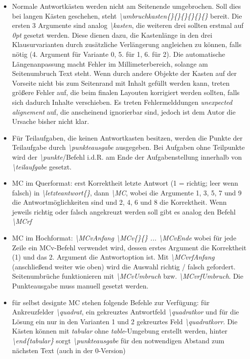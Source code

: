 \documentclass[./main.tex]{subfiles}
\begin{document}
\begin{itemize}
    \item Normale Antwortk\"asten werden nicht am Seitenende umgebrochen. Soll dies bei langen K\"asten geschehen, steht \textit{\textbackslash umbruchkasten\{\}\{\}\{\}\{\}\{\}\{\}} bereit. Die ersten 3 Argumente sind analog \textit{\textbackslash kasten}, die weiteren drei sollten erstmal auf \textit{0pt} gesetzt werden. Diese dienen dazu, die Kastenl\"ange in den drei Klausurvarianten durch zus\"atzliche Verl\"angerung angleichen zu k\"onnen, falls n\"otig (4. Argument f\"ur Variante 0, 5. f\"ur 1, 6. f\"ur 2). Die automatische L\"angenanpassung macht Fehler im Millimeterbereich, solange am Seitenumbruch Text steht. Wenn durch andere Objekte der Kasten auf der Vorseite nicht bis zum Seitenrand mit Inhalt gef\"ullt werden kann, treten gr\"o\ss{}ere Fehler auf, die beim finalen Layouten korrigiert werden sollten, falls sich dadurch Inhalte verschieben. Es treten Fehlermelddungen \textit{unexpected alignement} auf, die anscheinend ignorierbar sind, jedoch ist dem Autor die Ursache bisher nicht klar. 
    \item F\"ur Teilaufgaben, die keinen Antwortkasten besitzen, werden die Punkte der Teilaufgabe durch \textit{\textbackslash punkteausgabe} ausgegeben. Bei Aufgaben ohne Teilpunkte wird der \textit{\textbackslash punkte}\-/Befehl i.d.R. am Ende der Aufgabenstellung innerhalb von \textit{\textbackslash teilaufgabe} gesetzt. 
    \item MC im Querformat: erst Korrektheit letzte Antwort (1 = richtig; leer wenn falsch) in \textit{\textbackslash letzteantwort\{\}}, dann \textit{\textbackslash MC}, wobei die Argumente 1, 3, 5, 7 und 9 die Antwortm\"oglichkeiten sind und 2, 4, 6 und 8 die Korrektheit. Wenn jeweils richtig oder falsch angekreuzt werden soll gibt es analog den Befehl \textit{\textbackslash MCrf}
    \item MC im Hochformat: \textit{\textbackslash MCvAnfang \textbackslash MCv\{\}\{\} ... \textbackslash MCvEnde} wobei f\"ur jede Zeile ein MCv-Befehl verwendet wird, dessen erstes Argument die Korrektheit (1) und das 2. Argument die Antwortoption ist. Mit \textit{\textbackslash MCvrfAnfang} (anschlie\ss{}end weiter wie oben) wird die Auswahl richtig / falsch gefordert. Seitenumbrüche funktionieren mit \textit{\textbackslash MCvUmbruch} bzw. \textit{\textbackslash MCvrfUmbruch}. Die Punkteausgabe muss manuell gesetzt werden.
    \item f\"ur selbst designte MC stehen folgende Befehle zur Verf\"ugung: f\"ur Ankreuzfelder \textit{\textbackslash quadrat}, ein gekreuztes Antwortfeld \textit{\textbackslash quadratkor} und f\"ur die L\"osung ein nur in den Varianten 1 und 2 gekreuztes Feld \textit{\textbackslash quadratkorr}. Die K\"asten k\"onnen mit \textit{tabular} ohne \textit{table}-Umgebung erstellt werden, hinter \textit{\textbackslash end\{tabular\}} sorgt \textit{\textbackslash punkteausgabe} f\"ur den notwendigen Abstand zum n\"achsten Text (auch in der 0-Version)

\end{itemize}
\end{document}
